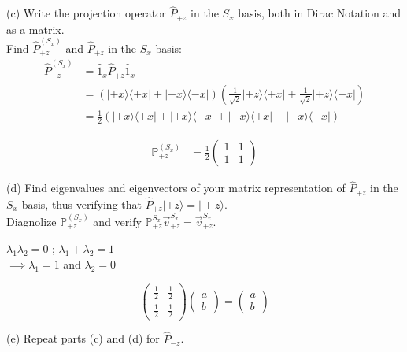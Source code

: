 \documentclass{article}
\begin{document}
(c) Write the projection operator $\hat{P}_{+z}$ in the $S_x$ basis, both in Dirac Notation and as a matrix.\\

Find $\hat{P}_{+z}^{(S_x)}$ and $\hat{P}_{+z}$ in the $S_x$ basis: \\

\begin{align*}
	\hat{P}_{+z}^{(S_x)} & = \hat{1}_x \hat{P}_{+z} \hat{1}_x\\
			     & = \left(|+x\rangle \langle+x| + |-x\rangle \langle-x|\right) \left(\frac{1}{\sqrt{2}} |+z\rangle \langle+x| + \frac{1}{\sqrt{2}} |+z\rangle \langle-x|\right)\\
			      & = \frac{1}{2}\left(|+x\rangle\langle +x| + |+x\rangle\langle -x| + |-x\rangle\langle +x| + |-x\rangle\langle -x|\right)
\end{align*}

\begin{align*}
    \mathbb{P}_{+z}^{(S_x)} & = \frac{1}{2} \left(\begin{array}{cc} 1 & 1 \\ 1 & 1 \end{array}\right)
\end{align*}


(d) Find eigenvalues and eigenvectors of your matrix representation of $\hat{P}_{+z}$ in the $S_x$ basis, thus verifying that $\hat{P}_{+z}|+z\rangle=|+z\rangle$.\\

Diagnolize $\mathbb{P}_{+z}^{(S_x)}$ and verify $\mathbb{P}_{+z}^{S_x}\vec{v}_{+z}^{S_x}=\vec{v}_{+z}^{S_x}$.\\

\begin{center}
$ \lambda_1 \lambda_2 = 0$ ; $\lambda_1 + \lambda_2 = 1$\\
$ \implies \lambda_1 = 1$ and $\lambda_2 = 0$\\
\end{center}

$$\left(\begin{array}{cc} \frac{1}{2} & \frac{1}{2} \\ \frac{1}{2} & \frac{1}{2}\end{array}\right) \left(\begin{array}{c} a \\ b\end{array}\right) = \left(\begin{array}{c} a \\ b\end{array}\right)$$



(e) Repeat parts (c) and (d) for $\hat{P}_{-z}$.

\end{document}
